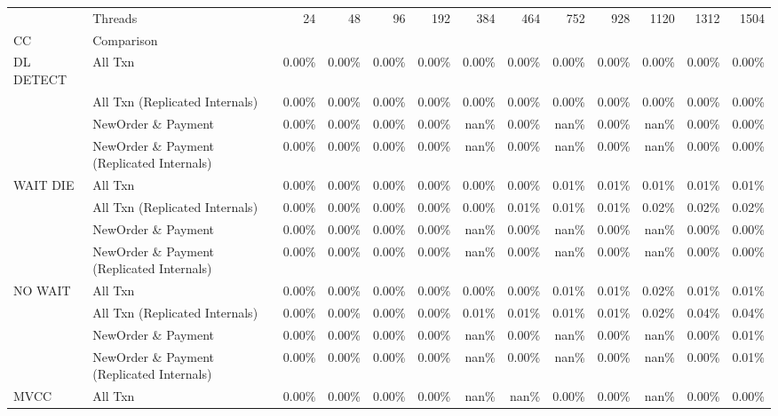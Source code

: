 \begin{tabular}{llrrrrrrrrrrr}
\toprule
       & Threads &  24   &  48   &  96   &  192  &  384  &  464  &  752  &  928  &  1120 &  1312 &  1504 \\
CC & Comparison &       &       &       &       &       &       &       &       &       &       &       \\
\midrule
DL DETECT & All Txn & 0.00\% & 0.00\% & 0.00\% & 0.00\% & 0.00\% & 0.00\% & 0.00\% & 0.00\% & 0.00\% & 0.00\% & 0.00\% \\
       & All Txn (Replicated Internals) & 0.00\% & 0.00\% & 0.00\% & 0.00\% & 0.00\% & 0.00\% & 0.00\% & 0.00\% & 0.00\% & 0.00\% & 0.00\% \\
       & NewOrder \& Payment & 0.00\% & 0.00\% & 0.00\% & 0.00\% &  nan\% & 0.00\% &  nan\% & 0.00\% &  nan\% & 0.00\% & 0.00\% \\
       & NewOrder \& Payment (Replicated Internals) & 0.00\% & 0.00\% & 0.00\% & 0.00\% &  nan\% & 0.00\% &  nan\% & 0.00\% &  nan\% & 0.00\% & 0.00\% \\
WAIT DIE & All Txn & 0.00\% & 0.00\% & 0.00\% & 0.00\% & 0.00\% & 0.00\% & 0.01\% & 0.01\% & 0.01\% & 0.01\% & 0.01\% \\
       & All Txn (Replicated Internals) & 0.00\% & 0.00\% & 0.00\% & 0.00\% & 0.00\% & 0.01\% & 0.01\% & 0.01\% & 0.02\% & 0.02\% & 0.02\% \\
       & NewOrder \& Payment & 0.00\% & 0.00\% & 0.00\% & 0.00\% &  nan\% & 0.00\% &  nan\% & 0.00\% &  nan\% & 0.00\% & 0.00\% \\
       & NewOrder \& Payment (Replicated Internals) & 0.00\% & 0.00\% & 0.00\% & 0.00\% &  nan\% & 0.00\% &  nan\% & 0.00\% &  nan\% & 0.00\% & 0.00\% \\
NO WAIT & All Txn & 0.00\% & 0.00\% & 0.00\% & 0.00\% & 0.00\% & 0.00\% & 0.01\% & 0.01\% & 0.02\% & 0.01\% & 0.01\% \\
       & All Txn (Replicated Internals) & 0.00\% & 0.00\% & 0.00\% & 0.00\% & 0.01\% & 0.01\% & 0.01\% & 0.01\% & 0.02\% & 0.04\% & 0.04\% \\
       & NewOrder \& Payment & 0.00\% & 0.00\% & 0.00\% & 0.00\% &  nan\% & 0.00\% &  nan\% & 0.00\% &  nan\% & 0.00\% & 0.01\% \\
       & NewOrder \& Payment (Replicated Internals) & 0.00\% & 0.00\% & 0.00\% & 0.00\% &  nan\% & 0.00\% &  nan\% & 0.00\% &  nan\% & 0.00\% & 0.01\% \\
MVCC & All Txn & 0.00\% & 0.00\% & 0.00\% & 0.00\% &  nan\% &  nan\% & 0.00\% & 0.00\% &  nan\% & 0.00\% & 0.00\% \\

\end{tabular}
